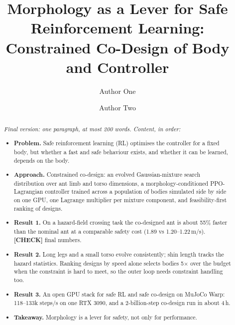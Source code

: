 \documentclass[sigconf,review]{acmart}
\newcommand{\statustag}[2]{\textcolor{#1}{\textsf{\scriptsize\bfseries[#2]}}}
\newcommand{\CHECK}{\statustag{orange!85!black}{CHECK}\hspace{0.3em}}
\begin{document}
\title[Morphology as a Lever for Safe RL]{Morphology as a Lever for Safe Reinforcement Learning: Constrained Co-Design of Body and Controller}

\author{Author One}

\author{Author Two}

\renewcommand{\shortauthors}{Anonymous et al.}

\begin{abstract}
\noindent\textit{Final version: one paragraph, at most 200 words. Content, in order:}
\begin{itemize}
\item \textbf{Problem.} Safe reinforcement learning (RL) optimises the controller for a fixed body, but whether a fast and safe behaviour exists, and whether it can be learned, depends on the body.
\item \textbf{Approach.} Constrained co-design: an evolved Gaussian-mixture search distribution over ant limb and torso dimensions, a morphology-conditioned PPO-Lagrangian controller trained across a population of bodies simulated side by side on one GPU, one Lagrange multiplier per mixture component, and feasibility-first ranking of designs.
\item \textbf{Result 1.} On a hazard-field crossing task the co-designed ant is about 55\% faster than the nominal ant at a comparable safety cost (1.89 vs 1.20--1.22\,m/s). \CHECK{} final numbers.
\item \textbf{Result 2.} Long legs and a small torso evolve consistently; shin length tracks the hazard statistics. Ranking designs by speed alone selects bodies 5$\times$ over the budget when the constraint is hard to meet, so the outer loop needs constraint handling too.
\item \textbf{Result 3.} An open GPU stack for safe RL and safe co-design on MuJoCo Warp: 118--133k steps/s on one RTX 3090, and a 2-billion-step co-design run in about 4\,h.
\item \textbf{Takeaway.} Morphology is a lever for safety, not only for performance.
\end{itemize}
\end{abstract}
\end{document}
